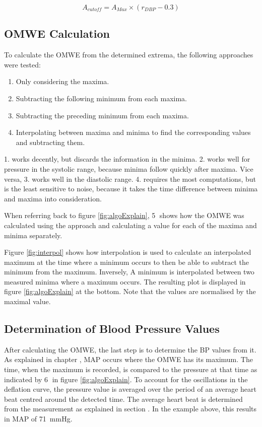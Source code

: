 \begin{equation}
\label{eq:cutoff}
A_{cutoff}=A_{Max}\times (r_{DBP} - 0.3)
\end{equation}

\subsection{OMWE Calculation}
To calculate the OMWE from the determined extrema, the following approaches were tested:

\begin{enumerate}[noitemsep]
\item Only considering the maxima.
\item Subtracting the following minimum from each maxima.
\item Subtracting the preceding minimum from each maxima.
\item Interpolating between maxima and minima to find the corresponding values and subtracting them. 
\end{enumerate}

1. works decently, but discards the information in the minima. 2. works well for pressure in the systolic range, because minima follow quickly after maxima. Vice versa, 3. works well in the diastolic range. 4. requires the most computations, but is the least sensitive to noise, because it takes the time difference between minima and maxima into consideration. 

When referring back to figure \ref{fig:algoExplain}, \textcircled{5} shows how the OMWE was calculated using the approach and calculating a value for each of the maxima and minima separately. 

Figure \ref{fig:interpol} shows how interpolation is used to calculate an interpolated maximum at the time where a minimum occurs to then be able to subtract the minimum from the maximum. Inversely, A minimum is interpolated between two measured minima where a maximum occurs. The resulting plot is displayed in figure \ref{fig:algoExplain} at the bottom. Note that the values are normalised by the maximal value.


\subsection{Determination of Blood Pressure Values}
After calculating the OMWE, the last step is to determine the BP values from it. As explained in chapter , MAP occurs where the OMWE has its maximum. The time, when the maximum is recorded, is compared to the pressure at that time as indicated by \textcircled{6} in figure \ref{fig:algoExplain}. To account for the oscillations in the deflation curve, the pressure value is averaged over the period of an average heart beat centred around the detected time. The average heart beat is determined from the measurement as explained in section . In the example above, this results in MAP of \SI{71}{\mmHg}.


